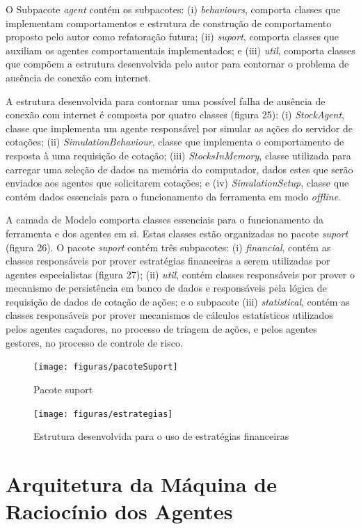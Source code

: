 O Subpacote \textit{agent} contém os subpacotes: (i) \textit{behaviours}, comporta classes que implementam comportamentos e estrutura de construção de comportamento proposto pelo autor como refatoração futura; (ii) \textit{suport}, comporta classes que auxiliam os agentes comportamentais implementados; e (iii) \textit{util}, comporta classes que compõem a estrutura desenvolvida pelo autor para contornar o problema de ausência de conexão com internet. 

A estrutura desenvolvida para contornar uma possível falha de ausência de conexão com internet é composta por quatro classes (figura 25): (i) \textit{StockAgent}, classe que implementa um agente responsável por simular as ações do servidor de cotações; (ii) \textit{SimulationBehaviour}, classe que implementa o comportamento de resposta à uma requisição de cotação; (iii) \textit{StocksInMemory}, classe utilizada para carregar uma seleção de dados na memória do computador, dados estes que serão enviados aos agentes que solicitarem cotações; e (iv) \textit{SimulationSetup}, classe que contém dados essenciais para o funcionamento da ferramenta em modo \textit{offline}.

A camada de Modelo comporta classes  essenciais para o funcionamento da ferramenta e dos agentes em si. Estas classes estão organizadas no pacote \textit{suport} (figura 26). O pacote \textit{suport} contém três subpacotes: (i) \textit{financial}, contém as classes responsáveis por prover estratégias financeiras a serem utilizadas por agentes especialistas (figura 27); (ii) \textit{util}, contém classes responsáveis por prover o mecanismo de persistência em banco de dados e responsáveis pela lógica de requisição de dados de cotação de ações; e o subpacote (iii) \textit{statistical}, contém as classes responsáveis por prover mecanismos de cálculos estatísticos utilizados pelos agentes caçadores, no processo de triagem de ações, e pelos agentes gestores, no processo de controle de risco.   

\begin{figure}[h!]
\centering
\label{f21}
\texttt{[image: figuras/pacoteSuport]}
\caption{Pacote suport}
\end{figure}


\begin{figure}[h!]
\centering
\label{f22}
\texttt{[image: figuras/estrategias]}
\caption{Estrutura desenvolvida para o uso de estratégias financeiras}
\end{figure}
\FloatBarrier

\section{Arquitetura da Máquina de Raciocínio dos Agentes}


